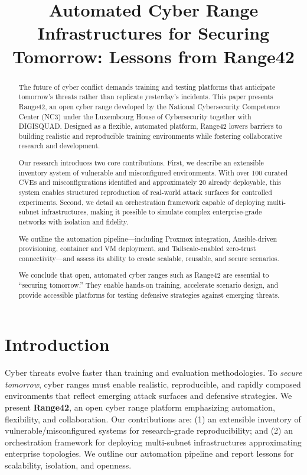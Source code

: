 \documentclass[11pt]{article}
\title{Automated Cyber Range Infrastructures for Securing Tomorrow: Lessons from Range42}
\author{} %
\date{}   %
\begin{document}
\maketitle

\begin{abstract}
The future of cyber conflict demands training and testing platforms that anticipate tomorrow’s threats rather than replicate yesterday’s incidents. This paper presents Range42, an open cyber range developed by the National Cybersecurity Competence Center (NC3) under the Luxembourg House of Cybersecurity together with DIGISQUAD. Designed as a flexible, automated platform, Range42 lowers barriers to building realistic and reproducible training environments while fostering collaborative research and development.

Our research introduces two core contributions. First, we describe an extensible inventory system of vulnerable and misconfigured environments. With over 100 curated CVEs and misconfigurations identified and approximately 20 already deployable, this system enables structured reproduction of real-world attack surfaces for controlled experiments. Second, we detail an orchestration framework capable of deploying multi-subnet infrastructures, making it possible to simulate complex enterprise-grade networks with isolation and fidelity.

We outline the automation pipeline—including Proxmox integration, Ansible-driven provisioning, container and VM deployment, and Tailscale-enabled zero-trust connectivity—and assess its ability to create scalable, reusable, and secure scenarios.

We conclude that open, automated cyber ranges such as Range42 are essential to “securing tomorrow.” They enable hands-on training, accelerate scenario design, and provide accessible platforms for testing defensive strategies against emerging threats.
\end{abstract}

\section{Introduction}
Cyber threats evolve faster than training and evaluation methodologies. To \emph{secure tomorrow}, cyber ranges must enable realistic, reproducible, and rapidly composed environments that reflect emerging attack surfaces and defensive strategies. We present \textbf{Range42}, an open cyber range platform emphasizing automation, flexibility, and collaboration. Our contributions are: (1) an extensible inventory of vulnerable/misconfigured systems for research-grade reproducibility; and (2) an orchestration framework for deploying multi-subnet infrastructures approximating enterprise topologies. We outline our automation pipeline and report lessons for scalability, isolation, and openness.
\end{document}
